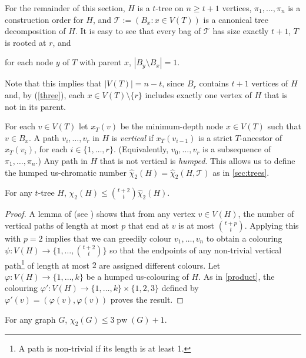 \documentclass[kpfonts]{patmorin}
\DeclareMathOperator{\pw}{pw}
\newcommand{\uqs}{\chi_2}
\newcommand{\hus}{\hat{\chi}_2}
\begin{document}
For the remainder of this section, $H$ is a $t$-tree on $n\ge t+1$ vertices, $\pi_1,\ldots,\pi_n$ is a construction order for $H$, and $\mathcal{T}:=(B_x:x\in V(T))$ is a canonical tree decomposition of $H$.  It is easy to see that every bag of $\mathcal{T}$ has size exactly $t+1$, $T$ is rooted at $r$, and
\begin{inparaenum}[(i)]\setcounter{enumi}{2}
  \item for each node $y$ of $T$ with parent $x$, $|B_y\setminus B_x|=1$.\label{three}
\end{inparaenum}
Note that this implies that $|V(T)|=n-t$, since $B_r$ contains $t+1$ vertices of $H$ and, by (\ref{three}), each $x\in V(T)\setminus\{r\}$ includes exactly one vertex of $H$ that is not in its parent.

For each $v\in V(T)$ let $x_T(v)$ be the minimum-depth node $x\in V(T)$ such that $v\in B_x$.  A path $v_i,\ldots,v_r$ in $H$ is \emph{vertical} if $x_T(v_{i-1})$ is a strict $T$-ancestor of $x_T(v_i)$, for each $i\in\{1,\ldots,r\}$. (Equivalently, $v_0,\ldots,v_r$ is a subsequence of $\pi_1,\ldots,\pi_n$.) Any path in $H$ that is not vertical is \emph{humped}.  This allows us to define the humped us-chromatic number $\hus(H)=\hus(H,\mathcal{T})$ as in \cref{sec:trees}.

\begin{lem}
    For any $t$-tree $H$, $\uqs(H)\le \binom{t+2}{t}\hus(H)$.
\end{lem}

\begin{proof}
    A lemma of \citet{pilipczuk.siebertz:polynomial} (see \cite[Lemma~13]{pilipczuk.siebertz:polynomial-arxiv}) shows that from any vertex $v\in V(H)$, the number of vertical paths of length at most $p$ that end at $v$ is at most $\binom{t+p}{t}$.  Applying this with $p=2$ implies that we can greedily colour $v_1,\ldots,v_n$ to obtain a colouring $\psi:V(H)\to \{1,\ldots,\binom{t+2}{t}\}$ so that the endpoints of any non-trivial vertical path\footnote{A path is non-trivial if its length is at least 1.} of length at most $2$ are assigned different colours.  Let $\varphi:V(H)\to\{1,\ldots,k\}$ be a humped us-colouring of $H$.  As in \cref{product}, the colouring $\varphi':V(H)\to\{1,\ldots,k\}\times \{1,2,3\}$ defined by $\varphi'(v)=(\varphi(v),\varphi(v))$ proves the result.
\end{proof}

\begin{lem}
    For any graph $G$, $\uqs(G)\le 3\pw(G)+1$.
\end{lem}
\end{document}
